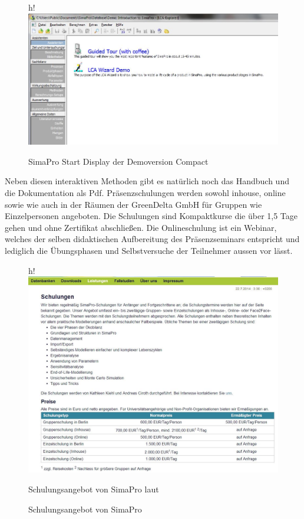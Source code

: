 \documentclass[a4paper, 12pt, twoside, BCOR=20mm, DIV=calc, abstracton, parskip=half*, toc=bibliography, toc=listof, headsepline, footsepline, headings=small, numbers=enddot]{scrreprt}
\begin{document}
\begin{figure}{h!}
\centering
\includegraphics[width=\textwidth]{Bild/Sima Pro Start.JPG}
\caption{SimaPro Start Display der Demoversion Compact}
\end{figure}
Neben diesen interaktiven Methoden gibt es natürlich noch das Handbuch und die Dokumentation als Pdf. 
Präsenzschulungen werden sowohl inhouse, online sowie wie auch in der Räumen der GreenDelta GmbH für Gruppen wie Einzelpersonen angeboten. Die Schulungen sind Kompaktkurse die über 1,5 Tage gehen und ohne Zertifikat abschließen. Die Onlineschulung ist ein Webinar, welches der selben didaktischen Aufbereitung des Präsenzseminars entspricht und lediglich die Übungsphasen und Selbstversuche der Teilnehmer aussen vor lässt.  
\begin{figure}{h!}
\centering
\includegraphics{Bild/Sima Pro Schulungsangebot.JPG}
\caption{Schulungsangebot von SimaPro}{Schulungsangebot von SimaPro laut \cite[Website vom 13.07.2014]{SimaPro_Homepage}}
\end{figure}
\end{document}
